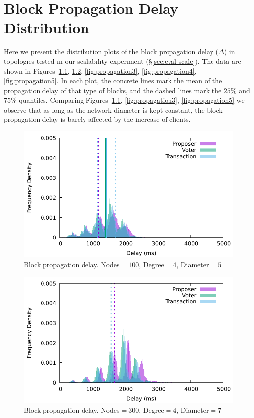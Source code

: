 \chapter{Block Propagation Delay Distribution}
\label{apx:propagation}

 Here we present the distribution plots of the block propagation delay ($\Delta$) in topologies tested in our scalability experiment (\S\ref{sec:eval-scale}). The data are shown in Figures~\ref{fig:propagation1}, \ref{fig:propagation2}, \ref{fig:propagation3}, \ref{fig:propagation4}, \ref{fig:propagation5}. In each plot, the concrete lines mark the mean of the propagation delay of that type of blocks, and the dashed lines mark the $25\%$ and $75\%$ quantiles. Comparing Figures~\ref{fig:propagation1}, \ref{fig:propagation3}, \ref{fig:propagation5} we observe that as long as the network diameter is kept constant, the block propagation delay is barely affected by the increase of clients.


\begin{figure}[t]
   \centering
   \includegraphics[width=0.8\linewidth]{figures/delay100nodes.pdf}
   \caption{Block propagation delay. Nodes$=100$, Degree$=4$, Diameter$=5$}%
   \label{fig:propagation1}
 \end{figure}
 
 \begin{figure}[t]
   \centering
   \includegraphics[width=0.8\linewidth]{figures/delay300nodes4.pdf}
   \caption{Block propagation delay. Nodes$=300$, Degree$=4$, Diameter$=7$}%
   \label{fig:propagation2}
 \end{figure}
 
